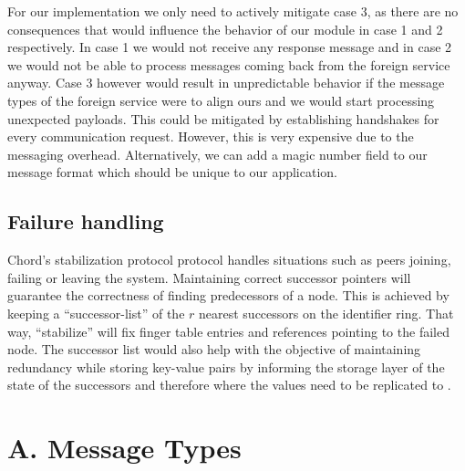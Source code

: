 \documentclass[a4paper, 11pt]{article}
\begin{document}
For our implementation we only need to actively mitigate case 3, as there are no consequences that would influence the behavior of our module in case 1 and 2 respectively. In case 1 we would not receive any response message and in case 2 we would not be able to process messages coming back from the foreign service anyway. Case 3 however would result in unpredictable behavior if the message types of the foreign service were to align ours and we would start processing unexpected payloads. This could be mitigated by establishing handshakes for every communication request. However, this is very expensive due to the messaging overhead. Alternatively, we can add a magic number field to our message format which should be unique to our application.

\subsection*{Failure handling}
Chord's stabilization protocol protocol handles situations such as peers joining, failing or leaving the system. Maintaining correct successor pointers will guarantee the correctness of finding predecessors of a node. This is achieved by keeping a ``successor-list'' of the $r$ nearest successors on the identifier ring. That way, ``stabilize'' will fix finger table entries and references pointing to the failed node. The successor list would also help with the objective of maintaining redundancy while storing key-value pairs by informing the storage layer of the state of the successors and therefore where the values need to be replicated to \cite{Chord}. 





\pagebreak

\section*{A. Message Types}

\end{document}
